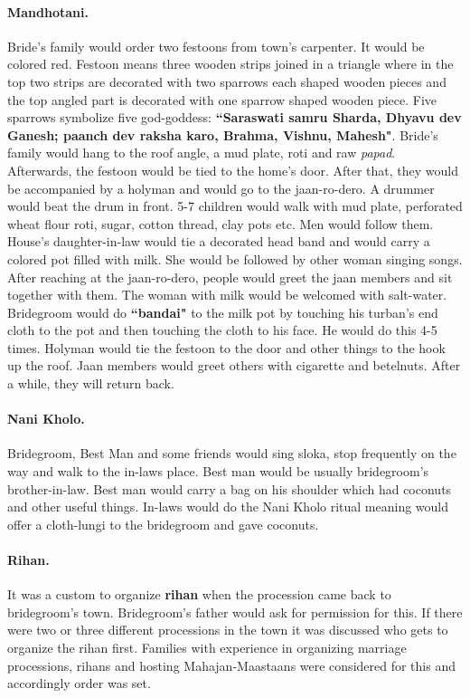\paragraph{Mandhotani.} Bride's family would order two festoons from town's
carpenter. It would be colored red. Festoon means three wooden strips joined in
a triangle where in the top two strips are decorated with two sparrows each
shaped wooden pieces and the top angled part is decorated with one sparrow
shaped wooden piece. Five sparrows symbolize five god-goddess:
\textbf{``Saraswati samru Sharda, Dhyavu dev Ganesh; paanch dev raksha karo,
Brahma, Vishnu, Mahesh"}. Bride's family would hang to the roof angle, a mud
plate, roti and raw \textit{papad}. Afterwards, the festoon would be tied to
the home's door. After that, they would be accompanied by a holyman and would
go to the jaan-ro-dero. A drummer would beat the drum in front. 5-7 children
would walk with mud plate, perforated wheat flour roti, sugar, cotton thread,
clay pots etc. Men would follow them. House's daughter-in-law would tie a
decorated head band and would carry a colored pot filled with milk. She would
be followed by other woman singing songs. After reaching at the jaan-ro-dero,
people would greet the jaan members and sit together with them. The woman with
milk would be welcomed with salt-water. Bridegroom would do \textbf{``bandai"} to the
milk pot by touching his turban's end cloth to the pot and then touching the
cloth to his face. He would do this 4-5 times. Holyman would tie the festoon to
the door and other things to the hook up the roof. Jaan members would greet
others with cigarette and betelnuts. After a while, they will return back.

\paragraph{Nani Kholo.} Bridegroom, Best Man and some friends would sing sloka, stop
frequently on the way and walk to the in-laws place. Best man would be usually
bridegroom's brother-in-law. Best man would carry a bag on his shoulder which had
coconuts and other useful things. In-laws would do the Nani Kholo ritual
meaning would offer a cloth-lungi to the bridegroom and gave coconuts.

\paragraph{Rihan.} It was a custom to organize \textbf{rihan} when the
procession came back to bridegroom's town. Bridegroom's father would ask for
permission for this. If there were two or three different processions in the
town it was discussed who gets to organize the rihan first. Families with experience in organizing marriage processions, rihans and hosting Mahajan-Maastaans were considered for this and accordingly order was set.

